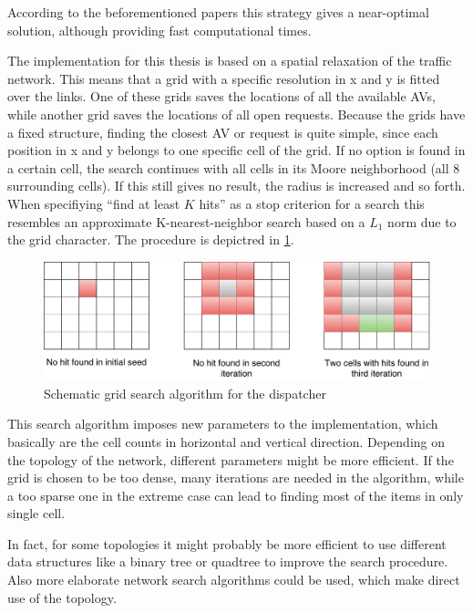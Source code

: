 According to the beforementioned papers this strategy gives a near-optimal solution,
although providing fast computational times.

The implementation for this thesis is based on a spatial relaxation of the traffic
network. This means that a grid with a specific resolution in x and y is fitted
over the links. One of these grids saves the locations of all the available AVs,
while another grid saves the locations of all open requests. Because the grids have
a fixed structure, finding the closest AV or request is quite simple, since each
position in x and y belongs to one specific cell of the grid. If no option is found
in a certain cell, the search continues with all cells in its Moore neighborhood
(all 8 surrounding cells). If this still gives no result, the radius is increased
and so forth. When specifiying ``find at least $K$ hits'' as a stop criterion for
a search this resembles an approximate K-nearest-neighbor search based on a $L_1$
norm due to the grid character.
The procedure is depictred in \cref{fig:gridsearch}.

\begin{figure}
    \centering
    \includegraphics[width=1.0\textwidth]{figures/gridsearch.pdf}
    \caption{Schematic grid search algorithm for the dispatcher}
    \label{fig:gridsearch}
\end{figure}

This search algorithm imposes new parameters to the implementation, which basically
are the cell counts in horizontal and vertical direction. Depending on the topology
of the network, different parameters might be more efficient. If the grid is chosen
to be too dense, many iterations are needed in the algorithm, while a too sparse one
in the extreme case can lead to finding most of the items in only single cell.

In fact, for some topologies it might probably be more efficient to use different
data structures like a binary tree or quadtree to improve the search procedure.
Also more elaborate network search algorithms could be used, which make direct use
of the topology. 

